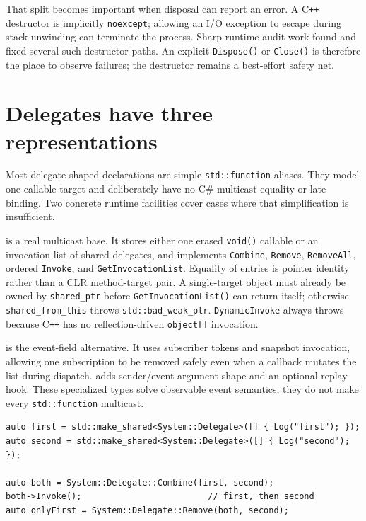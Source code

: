 That split becomes important when disposal can report an error. A C\texttt{++} destructor is
implicitly \texttt{noexcept}; allowing an I/O exception to escape during stack unwinding can
terminate the process. Sharp-runtime audit work found and fixed several such destructor paths.
An explicit \texttt{Dispose()} or \texttt{Close()} is therefore the place to observe failures;
the destructor remains a best-effort safety net.

\section{Delegates have three representations}

Most delegate-shaped declarations are simple \texttt{std::function} aliases. They model one
callable target and deliberately have no C\# multicast equality or late binding. Two concrete
runtime facilities cover cases where that simplification is insufficient.

 is a real multicast base. It stores either one erased
\texttt{void()} callable or an invocation list of shared delegates, and implements
\texttt{Combine}, \texttt{Remove}, \texttt{RemoveAll}, ordered \texttt{Invoke}, and
\texttt{GetInvocationList}. Equality of entries is pointer identity rather than a CLR
method-target pair. A single-target object must already be owned by \texttt{shared\_ptr} before
\texttt{GetInvocationList()} can return itself; otherwise \texttt{shared\_from\_this} throws
\texttt{std::bad\_weak\_ptr}. \texttt{DynamicInvoke} always throws because C\texttt{++} has
no reflection-driven \texttt{object[]} invocation.

 is the event-field alternative. It uses subscriber
tokens and snapshot invocation, allowing one subscription to be removed safely even when a
callback mutates the list during dispatch.  adds sender/event-argument
shape and an optional replay hook. These specialized types solve observable event semantics;
they do not make every \texttt{std::function} multicast.

\begin{lstlisting}
auto first = std::make_shared<System::Delegate>([] { Log("first"); });
auto second = std::make_shared<System::Delegate>([] { Log("second"); });

auto both = System::Delegate::Combine(first, second);
both->Invoke();                         // first, then second
auto onlyFirst = System::Delegate::Remove(both, second);
\end{lstlisting}

